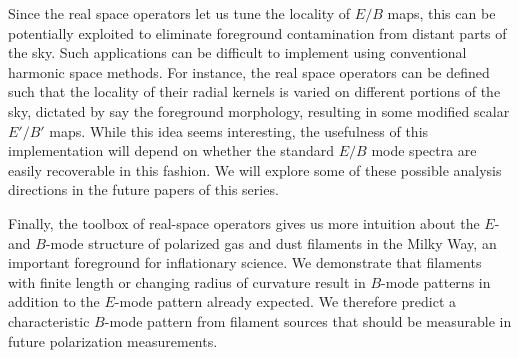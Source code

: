 

 
Since the real space operators let us tune the locality of $E/B$ maps, this can be potentially exploited to eliminate foreground contamination from distant parts of the sky. Such applications can be difficult to implement using conventional harmonic space methods.  For instance, the real space operators can be defined such that the locality of their radial kernels is varied on different portions of the sky, dictated by say the foreground morphology, resulting in some modified scalar $E'/B'$ maps.  While this idea seems interesting, the usefulness of this implementation will depend on whether the standard $E/B$ mode spectra are easily recoverable in this fashion.  We will explore some of these possible analysis directions in the future papers of this series.

Finally, the toolbox of real-space operators gives us more intuition about the $E$- and $B$-mode structure of polarized gas and dust filaments in the Milky Way, an important foreground for inflationary science. We demonstrate that filaments with finite length or changing radius of curvature result in $B$-mode patterns in addition to the $E$-mode pattern already expected.  We therefore predict a characteristic $B$-mode pattern from filament sources that should be measurable in future polarization measurements.

